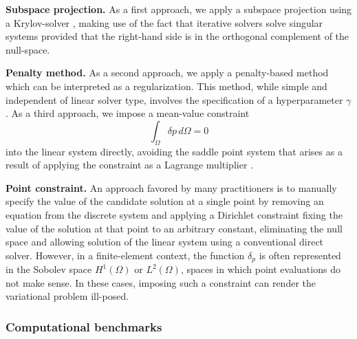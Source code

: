 \textbf{Subspace projection.} As a first approach, we apply a subspace projection using a Krylov-solver \cite{vorst_iterative_2003}, making use of the fact that iterative solvers solve singular systems provided that the right-hand side is in the orthogonal complement of the null-space.

\textbf{Penalty method.}
As a second approach, we apply a penalty-based method which can be interpreted as a regularization.
This method, while simple and independent of linear solver type, involves the specification of a hyperparameter $\gamma$.
As a third approach, we impose a mean-value constraint 
\begin{equation}
  \int_{\Omega}^{} \delta p \,d\Omega = 0
  \label{eq:mean_value_zero_condition}
\end{equation}
into the linear system directly, avoiding the saddle point system that arises as a result of applying the constraint as a Lagrange multiplier \cite{bochev_finite_2005}.

\textbf{Point constraint.} An approach favored by many practitioners is to manually specify the value of the candidate solution at a single point by removing an equation from the discrete system and applying a Dirichlet constraint fixing the value of the solution at that point to an arbitrary constant, eliminating the null space and allowing solution of the linear system using a conventional direct solver.
However, in a finite-element context, the function $\delta_p$ is often represented in the Sobolev space $H^1(\Omega)$ or $L^2(\Omega)$, spaces in which point evaluations do not make sense. 
In these cases, imposing such a constraint can render the variational problem ill-posed.

\subsubsection{Computational benchmarks}

